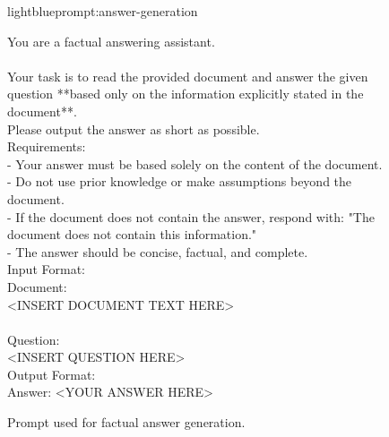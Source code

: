 \documentclass{applemlr}
\numberwithin{equation}{section}
\begin{document}
\begin{figure}[t]
\centering
\begin{minipage}{0.95\textwidth}
\begin{promptbox}[\color{black}{Prompt for Answer Generation}]{lightblue}{prompt:answer-generation}
\label{temp:answer_generation_prompt}

\ttfamily
You are a factual answering assistant. \\
\\
Your task is to read the provided document and answer the given question **based only on the information explicitly stated in the document**. \\
Please output the answer as short as possible. \\
Requirements: \\
- Your answer must be based solely on the content of the document. \\
- Do not use prior knowledge or make assumptions beyond the document. \\
- If the document does not contain the answer, respond with: "The document does not contain this information." \\
- The answer should be concise, factual, and complete. \\[6pt]

Input Format: \\
Document: \\
<INSERT DOCUMENT TEXT HERE> \\
\\
Question: \\
<INSERT QUESTION HERE> \\[6pt]

Output Format: \\
Answer: <YOUR ANSWER HERE> 
\end{promptbox}
\end{minipage}
\caption{Prompt used for factual answer generation.}
\label{prompt_answer_generation}
\end{figure}
\end{document}
